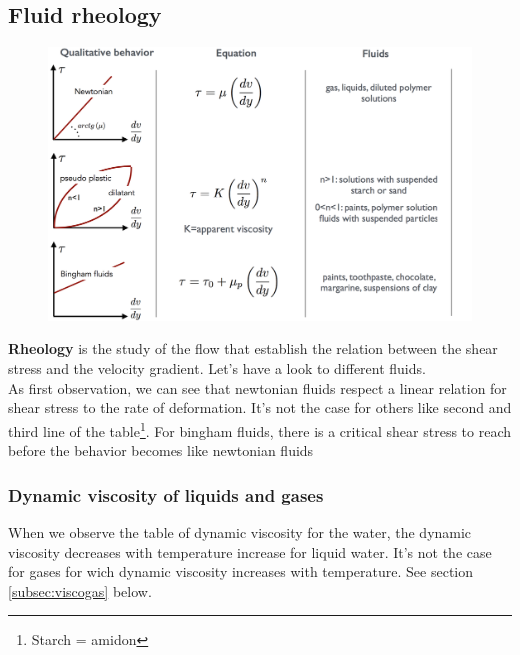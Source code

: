 \subsection{Fluid rheology}
\begin{figure}
	\vspace{-5mm}
	\includegraphics[scale=0.25]{ch1/7}
\end{figure}
\textbf{Rheology} is the study of the flow that establish the relation between the shear stress and the velocity gradient. Let's have a look to different fluids. \\
As first observation, we can see that newtonian fluids respect a linear relation for shear stress to the rate of deformation. It's not the case for others like second and third line of the table\footnote{Starch = amidon}. For bingham fluids, there is a critical shear stress to reach before the behavior becomes like newtonian fluids 
	
\subsubsection{Dynamic viscosity of liquids and gases}	
When we observe the table of dynamic viscosity for the water, the dynamic viscosity decreases with temperature increase for liquid water. It's not the case for gases for wich dynamic viscosity increases with temperature. See section \ref{subsec:viscogas} below.
	
